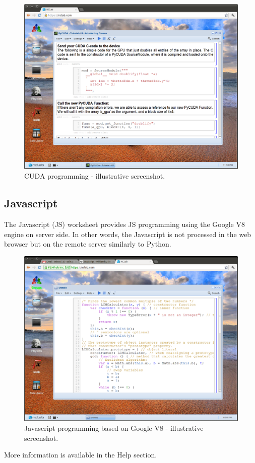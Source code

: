 \documentclass[article,A4,12pt]{llncs}
\begin{document}
\begin{figure}[!ht]
\begin{center}
\includegraphics[width=\textwidth]{img/progr4.png}
\end{center}
\caption{CUDA programming - illustrative screenshot.}
\label{fig:progr4}
\end{figure}
\noindent


\subsection{Javascript}

The Javascript (JS) worksheet provides JS programming using the Google V8 engine 
on server side. In other words, the Javascript is not processed in the web browser but 
on the remote server similarly to Python. 
\newpage
\begin{figure}[!ht]
\begin{center}
\includegraphics[width=\textwidth]{img/progr5.png}
\end{center}
\caption{Javascript programming based on Google V8 - illustrative screenshot.}
\label{fig:progr5}
\end{figure}
\noindent
More information is available in the Help section.
\end{document}
